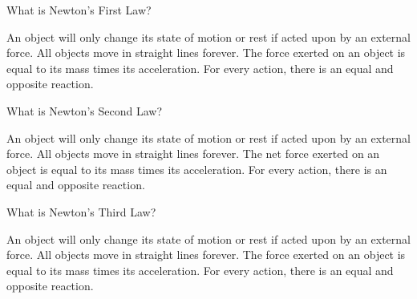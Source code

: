 \begin{questions}
\begin{parts}
\part 

\begin{tcolorbox}[colframe=black,colback=white,boxrule=1pt,width=0.9\textwidth,height=15mm]
\end{tcolorbox}
\end{parts}

\qsp


\newpage
{}


\question[1] What is Newton's First Law? 

\begin{choices}
\choice An object will only change its state of motion or rest if acted upon by an external force.
\choice All objects move in straight lines forever.
\choice The force exerted on an object is equal to its mass times its acceleration.
\choice For every action, there is an equal and opposite reaction. 
\end{choices}

\qsp

\question[1] What is Newton's Second Law? 

\begin{choices}
\choice An object will only change its state of motion or rest if acted upon by an external force.
\choice All objects move in straight lines forever.
\choice The net force exerted on an object is equal to its mass times its acceleration.
\choice For every action, there is an equal and opposite reaction.
\end{choices}

\qsp

\question[1] What is Newton's Third Law? 

\begin{choices}
\choice An object will only change its state of motion or rest if acted upon by an external force.
\choice All objects move in straight lines forever.
\choice The force exerted on an object is equal to its mass times its acceleration.
\choice For every action, there is an equal and opposite reaction.
\end{choices}

\qsp

\question[2] 
\qsp
\begin{parts}

\end{parts}
\end{questions}
